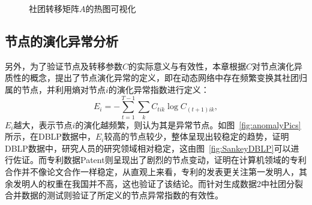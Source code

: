 \begin{figure}
\centering
{}
\;\;\;\;
\caption{社团转移矩阵$A$的热图可视化}%
\label{fig:block}
\end{figure}

\subsection{节点的演化异常分析}
另外，为了验证节点及转移参数$C$的实际意义与有效性，本章根据$C$对节点演化异质性的概念，提出了节点演化异常的定义，即在动态网络中存在频繁变换其社团归属的节点，并利用熵对节点$i$的演化异常指数进行定义：
\begin{equation}
	E_i = -\sum_{t=1}^{T-1} \sum_{k} C_{tik} \log C_{(t+1)ik},
	\label{Nodeanomaly3}
\end{equation}
$E_i$越大，表示节点$i$的演化越频繁，则认为其是异常节点。如图~\ref{fig:anomalyPics}所示，在DBLP数据中，$E_i$较高的节点较少，整体呈现出较稳定的趋势，证明DBLP数据中，研究人员的研究领域相对稳定，这由图~\ref{fig:SankeyDBLP}可以进行佐证。而专利数据Patent则呈现出了剧烈的节点变动，证明在计算机领域的专利合作并不像论文合作一样稳定，从直观上来看，专利的发表更关注第一发明人，其余发明人的权重在我国并不高，这也验证了该结论。而针对生成数据2中社团分裂合并数据的测试则验证了所定义的节点异常指数的有效性。



